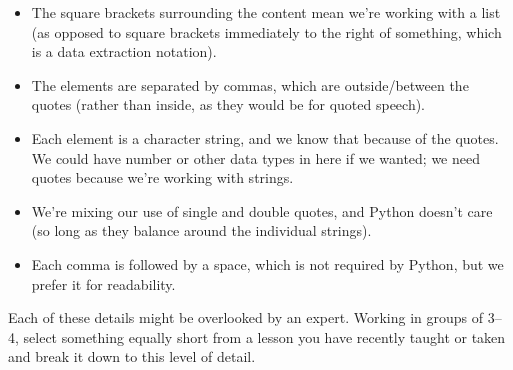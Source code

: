 \begin{itemize}

\item
  The square brackets surrounding the content mean we're working with
  a list (as opposed to square brackets immediately to the right of
  something, which is a data extraction notation).

\item
  The elements are separated by commas, which are outside/between the
  quotes (rather than inside, as they would be for quoted speech).

\item
  Each element is a character string, and we know that because of the
  quotes. We could have number or other data types in here if we
  wanted; we need quotes because we're working with strings.

\item
  We're mixing our use of single and double quotes, and Python doesn't
  care (so long as they balance around the individual strings).

\item
  Each comma is followed by a space, which is not required by Python,
  but we prefer it for readability.

\end{itemize}

\noindent
Each of these details might be overlooked by an expert.  Working in
groups of 3--4, select something equally short from a lesson you have
recently taught or taken and break it down to this level of detail.
